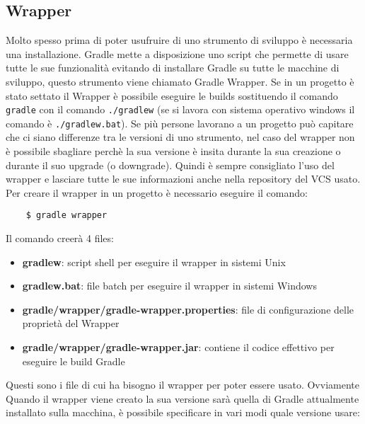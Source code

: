 \subsection{Wrapper}
Molto spesso prima di poter usufruire di uno strumento di sviluppo è necessaria una installazione. Gradle mette a disposizione uno script che permette di usare tutte le sue funzionalità evitando di installare Gradle su tutte le macchine di sviluppo, questo strumento viene chiamato Gradle Wrapper. Se in un progetto è stato settato il Wrapper è possibile eseguire le builds sostituendo il comando \texttt{gradle} con il comando \texttt{./gradlew} (se si lavora con sistema operativo windows il comando è \texttt{./gradlew.bat}). Se più persone lavorano a un progetto può capitare che ci siano differenze tra le versioni di uno strumento, nel caso del wrapper non è possibile sbagliare perchè la sua versione è insita durante la sua creazione o durante il suo upgrade (o downgrade). Quindi è sempre consigliato l'uso del wrapper e lasciare tutte le sue informazioni anche nella repository del VCS usato. Per creare il wrapper in un progetto è necessario eseguire il comando:
\begin{verbatim}
    $ gradle wrapper\end{verbatim}
Il comando creerà 4 files:
\begin{itemize}
    \item \textbf{gradlew}: script shell per eseguire il wrapper in sistemi Unix
    \item \textbf{gradlew.bat}: file batch per eseguire il wrapper in sistemi Windows
    \item \textbf{gradle/wrapper/gradle-wrapper.properties}: file di configurazione delle proprietà del Wrapper
    \item \textbf{gradle/wrapper/gradle-wrapper.jar}: contiene il codice effettivo per eseguire le build Gradle
\end{itemize}
Questi sono i file di cui ha bisogno il wrapper per poter essere usato. Ovviamente Quando il wrapper viene creato la sua versione sarà quella di Gradle attualmente installato sulla macchina, è possibile specificare in vari modi quale versione usare:
